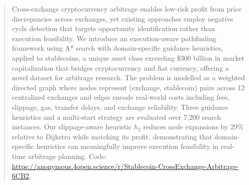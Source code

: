 \begin{abstract}
Cross-exchange cryptocurrency arbitrage enables low-risk profit from price discrepancies across exchanges, yet existing approaches employ negative cycle detection that targets opportunity identification rather than execution feasibility. We introduce an execution-aware pathfinding framework using A* search with domain-specific guidance heuristics, applied to stablecoins, a unique asset class exceeding \$300 billion in market capitalization that bridges cryptocurrency and fiat currency, offering a novel dataset for arbitrage research. The problem is modelled as a weighted directed graph where nodes represent (exchange, stablecoin) pairs across 12 centralized exchanges and edges encode real-world costs including fees, slippage, gas, transfer delays, and exchange reliability. Three guidance heuristics and a multi-start strategy are evaluated over 7{,}200 search instances. Our slippage-aware heuristic $h_2$ reduces node expansions by 29\% relative to Dijkstra while matching its profit, demonstrating that domain-specific heuristics can meaningfully improve execution feasibility in real-time arbitrage planning. Code: \url{https://anonymous.4open.science/r/Stablecoin-CrossExchange-Arbitrage-6CB2}.
\end{abstract}
